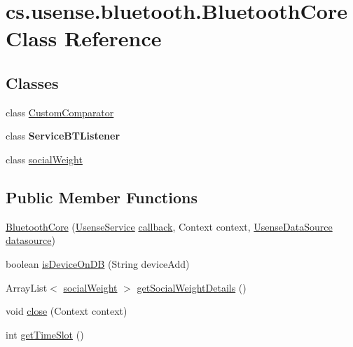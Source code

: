 \hypertarget{classcs_1_1usense_1_1bluetooth_1_1_bluetooth_core}{}\section{cs.\+usense.\+bluetooth.\+Bluetooth\+Core Class Reference}
\label{classcs_1_1usense_1_1bluetooth_1_1_bluetooth_core}
\subsection*{Classes}
\begin{DoxyCompactItemize}
\item 
class \hyperlink{classcs_1_1usense_1_1bluetooth_1_1_bluetooth_core_1_1_custom_comparator}{Custom\+Comparator}
\item 
class {\bfseries Service\+B\+T\+Listener}
\item 
class \hyperlink{classcs_1_1usense_1_1bluetooth_1_1_bluetooth_core_1_1social_weight}{social\+Weight}
\end{DoxyCompactItemize}
\subsection*{Public Member Functions}
\begin{DoxyCompactItemize}
\item 
\hyperlink{classcs_1_1usense_1_1bluetooth_1_1_bluetooth_core_a9af11f1f986f7f68855dde14466786de}{Bluetooth\+Core} (\hyperlink{classcs_1_1usense_1_1_usense_service}{Usense\+Service} \hyperlink{classcs_1_1usense_1_1bluetooth_1_1_bluetooth_core_a5530810b882ef730a46d074198ea451e}{callback}, Context context, \hyperlink{classcs_1_1usense_1_1db_1_1_usense_data_source}{Usense\+Data\+Source} \hyperlink{classcs_1_1usense_1_1bluetooth_1_1_bluetooth_core_ad72cf575891bf65d1b9f82057fc84708}{datasource})
\item 
boolean \hyperlink{classcs_1_1usense_1_1bluetooth_1_1_bluetooth_core_ac1c50f40ea9a7b2b49328dc9c07d5ec5}{is\+Device\+On\+D\+B} (String device\+Add)
\item 
Array\+List$<$ \hyperlink{classcs_1_1usense_1_1bluetooth_1_1_bluetooth_core_1_1social_weight}{social\+Weight} $>$ \hyperlink{classcs_1_1usense_1_1bluetooth_1_1_bluetooth_core_a159e169412477f7dbb619e62e8e6c87e}{get\+Social\+Weight\+Details} ()
\item 
void \hyperlink{classcs_1_1usense_1_1bluetooth_1_1_bluetooth_core_ad2c3995038ddeeffa9d2da2bef963a4f}{close} (Context context)
\item 
int \hyperlink{classcs_1_1usense_1_1bluetooth_1_1_bluetooth_core_aa1ee5dac7e3b9e6987f53726867930e4}{get\+Time\+Slot} ()
\end{DoxyCompactItemize}
